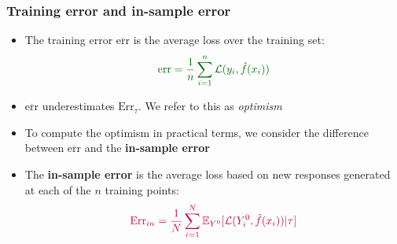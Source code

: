 \documentclass[smaller]{beamer}
\newcommand{\?}{\stackrel{?}{=}}
\newcommand{\fr}{\frac}
\newcommand{\ol}{\overline}
\newcommand{\pl}{\color{purple}}
\newcommand{\gr}{\color{green!40!black}}
\newcommand{\Err}{\text{Err}}
\newcommand{\err}{\text{err}}
\begin{document}
\begin{frame}
  \frametitle{Training error and in-sample error}\pause
  
    \begin{itemize}
    \item The training error {\gr $\ol{\err}$} is the average loss over the training set:\pause
      \begin{equation}
        \label{eq:22}\gr
        \err = \fr1n\sum_{i=1}^n\mathcal{L}(y_i, \hat f(x_i))
      \end{equation}
\pause
    \item $\ol{\err}$  underestimates  $\Err_\tau$. We refer to this as \textit{optimism}
\pause
    \item To compute the optimism in practical terms, we consider the difference between $\ol{\err}$ and the \textbf{in-sample error}
\pause
    \item The \textbf{\pl in-sample error} is the average loss based on new responses generated at each of the $n$ training points:\pause
      \begin{equation}
        \label{eq:6}\pl
        \Err_{in} = \fr1N\sum_{i=1}^N\mathbb{E}_{Y^0}[\mathcal{L}(Y_i^0, \hat f(x_i))|\tau]
      \end{equation}
  \end{itemize}
\end{frame}
\end{document}

